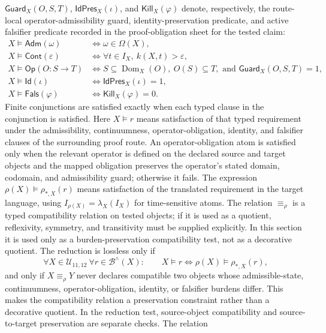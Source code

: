 \(\mathsf{Guard}_X(O,S,T)\), \(\mathsf{IdPres}_X(\iota)\), and
\(\mathsf{Kill}_X(\varphi)\) denote, respectively, the route-local
operator-admissibility guard, identity-preservation predicate, and active
falsifier predicate recorded in the proof-obligation sheet for the tested
claim:
\[
\begin{aligned}
X\models\mathsf{Adm}(\omega) &\Longleftrightarrow
  \omega\in\Omega(X),\\
X\models\mathsf{Cont}(\varepsilon) &\Longleftrightarrow
  \forall t\in I_X,\ k(X,t)>\varepsilon,\\
X\models\mathsf{Op}(O:S\to T) &\Longleftrightarrow
  S\subseteq\operatorname{Dom}_X(O),\ O(S)\subseteq T,\text{ and }
  \mathsf{Guard}_X(O,S,T)=1,\\
X\models\mathsf{Id}(\iota) &\Longleftrightarrow
  \mathsf{IdPres}_X(\iota)=1,\\
X\models\mathsf{Fals}(\varphi) &\Longleftrightarrow
  \mathsf{Kill}_X(\varphi)=0.
\end{aligned}
\]
Finite conjunctions are satisfied exactly when each typed clause in the
conjunction is satisfied. Here
\(X\models r\) means satisfaction of that typed requirement under the
admissibility, continuumness, operator-obligation, identity, and falsifier
clauses of the surrounding proof route. An operator-obligation atom is satisfied
only when the relevant operator is defined on the declared source and target
objects and the mapped obligation preserves the operator's stated domain,
codomain, and admissibility guard; otherwise it fails. The expression
\(\rho(X)\models\rho_{\ast,X}(r)\) means satisfaction
of the translated requirement in the target language, using
\(I_{\rho(X)}=\lambda_X(I_X)\) for time-sensitive atoms. The relation
\(\equiv_{\rho}\) is a typed compatibility relation on tested objects; if it
is used as a quotient, reflexivity, symmetry, and transitivity must be supplied
explicitly. In this section it is used only as a burden-preservation
compatibility test, not
as a decorative quotient. The reduction is lossless only if
\[
  \forall X\in\mathcal{U}_{11,12}\ \forall r\in\mathcal{B}^{\wedge}(X):
  \qquad X\models r \Longleftrightarrow \rho(X)\models \rho_{\ast,X}(r),
\]
and only if \(X\equiv_{\rho}Y\) never declares compatible two objects whose
admissible-state, continuumness, operator-obligation, identity, or falsifier burdens differ. This
makes the compatibility relation a preservation constraint rather than a
decorative quotient. In the reduction test, source-object compatibility and
source-to-target preservation are separate checks. The relation
